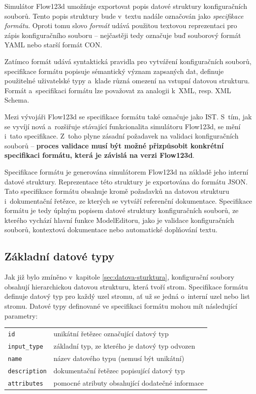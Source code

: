 \documentclass[FM,bw,DP]{tulthesis}
\begin{document}
Simulátor Flow123d umožňuje exportovat popis datové struktury konfiguračních souborů. Tento popis struktury bude v~textu nadále označován jako \textit{specifikace formátu}. Oproti tomu slovo \textit{formát} udává použitou textovou reprezentaci pro zápis konfiguračního souboru -- nejčastěji tedy označuje buď souborový formát \gls{YAML} nebo starší formát \gls{CON}.

Zatímco formát udává syntaktická pravidla pro vytváření konfiguračních souborů, specifikace formátu popisuje sémantický význam zapsaných dat, definuje použitelné uživatelské typy a~klade různá omezení na vstupní datovou strukturu. Formát a~specifikaci formátu lze považovat za analogii k~\gls{XML}, resp. \gls{XML} Schema.

Mezi vývojáři Flow123d se specifikace formátu také označuje jako \gls{IST}. S~tím, jak se vyvíjí nová a~rozšiřuje stávající funkcionalita simulátoru Flow123d, se mění i~tato specifikace. Z~toho plyne zásadní požadavek na validaci konfiguračních souborů -- \textbf{proces validace musí být možné přizpůsobit konkrétní specifikaci formátu, která je závislá na verzi Flow123d}.

Specifikace formátu je generována simulátorem Flow123d na základě jeho interní datové struktury. Reprezentace této struktury je exportována do formátu \gls{JSON}. Tato specifikace formátu obsahuje kromě požadavků na datovou strukturu i~dokumentační řetězce, ze kterých se vytváří referenční dokumentace. Specifikace formátu je tedy úplným popisem datové struktury konfiguračních souborů, ze kterého vychází hlavní funkce ModelEditoru, jako je validace konfiguračních souborů, kontextová dokumentace nebo automatické doplňování textu.

\subsection{Základní datové typy}
\label{sec:analyza-specifikace-formatu-zakladni-datove-typy}
Jak již bylo zmíněno v~kapitole \ref{sec:datova-sturktura}, konfigurační soubory obsahují hierarchickou datovou strukturu, která tvoří strom. Specifikace formátu definuje datový typ pro každý uzel stromu, ať už se jedná o~interní uzel nebo list stromu. Datové typy definované ve specifikaci formátu mohou mít následující parametry:

\vspace{0.5cm}
\begin{tabular}{m{3cm}@{}l}
\texttt{id}\dotfill & unikátní řetězec označující datový typ \\
\texttt{input\_type}\dotfill & základní typ, ze kterého je datový typ odvozen  \\
\texttt{name}\dotfill & název datového typu (nemusí být unikátní) \\
\texttt{description}\dotfill & dokumentační řetězec popisující datový typ \\
\texttt{attributes}\dotfill & pomocné atributy obsahující dodatečné informace \\
\end{tabular}
\vspace{0.5cm}
\end{document}
